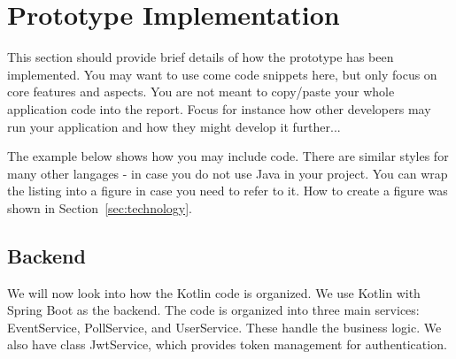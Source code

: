 \section{Prototype Implementation}
\label{sec:implementation}


This section should provide brief details of how the prototype has been implemented.
You may want to use come code snippets here, but only focus on core features and aspects.
You are not meant to copy/paste your whole application code into the report.
Focus for instance how other developers may run your application and how they might develop it further...


The example below shows how you may include code. There are similar
styles for many other langages - in case you do not use Java in your
project. You can wrap the listing into a figure in case you need to
refer to it. How to create a figure was shown in Section~\ref{sec:technology}.



\subsection{Backend}

We will now look into how the Kotlin code is organized. We use Kotlin with Spring Boot as the backend. The code is organized into three main services: EventService, PollService, and UserService. These handle the business logic. We also have class JwtService,  which provides token management for authentication.
 
